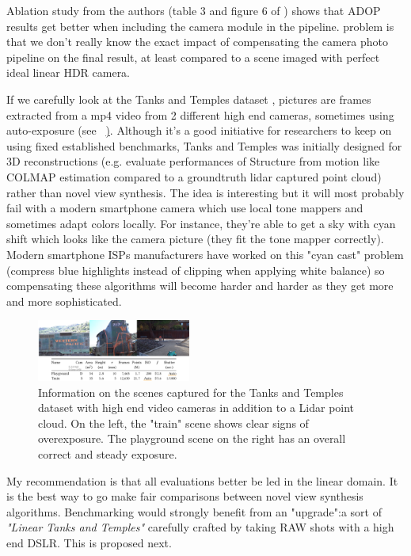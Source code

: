 Ablation study from the authors (table 3 and figure 6 of \cite{Aruckert2022adop}) shows that ADOP results get better when including the camera module in the pipeline. problem is that we don't really know the exact impact of compensating the camera photo pipeline on the final result, at least compared to a scene imaged with perfect ideal linear HDR camera.

If we carefully look at the Tanks and Temples dataset \cite{Knapitsch2017TanksAndTemples}, pictures are frames extracted from a mp4 video from 2 different high end cameras, sometimes using auto-exposure (see ~\href{fig:tank_and_temples}). Although it's a good initiative for researchers to keep on using fixed established benchmarks, Tanks and Temples was initially designed for 3D reconstructions (e.g. evaluate performances of Structure from motion like COLMAP estimation compared to a groundtruth lidar captured point cloud) rather than novel view synthesis. The idea is interesting but it will most probably fail with a modern smartphone camera which use local tone mappers and sometimes adapt colors locally. For instance, they're able to get a sky with cyan shift which looks like the camera picture (they fit the tone mapper correctly). Modern smartphone ISPs manufacturers have worked on this "cyan cast" problem (compress blue highlights instead of clipping when applying white balance) so compensating these algorithms will become harder and harder as they get more and more sophisticated.


\begin{figure}[H]
    \centering
    \includegraphics[width=0.45\textwidth]{figures/tanks_and_temples.png}
    \caption{Information on the scenes captured for the Tanks and Temples dataset with high end video cameras in addition to a Lidar point cloud. On the left, the "train" scene shows clear signs of overexposure. The playground scene on the right has an overall correct and steady exposure.}
    \label{fig:tank_and_temples}
\end{figure}


My recommendation is that all evaluations better be led in the linear domain. It is the best way to go make fair comparisons between novel view synthesis algorithms. Benchmarking would strongly benefit from an "upgrade":a sort of \textit{"Linear Tanks and Temples"} carefully crafted by taking RAW shots with a high end DSLR. This is proposed next.

